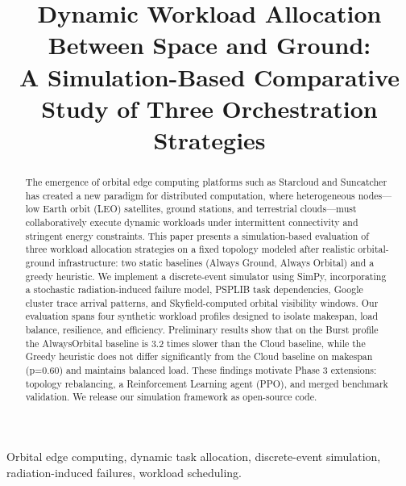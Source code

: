 \documentclass[conference]{IEEEtran}
\begin{document}
\title{Dynamic Workload Allocation Between Space and Ground:\\ A Simulation-Based Comparative Study of Three Orchestration Strategies}

\author{
}

\maketitle

\begin{abstract}
The emergence of orbital edge computing platforms such as Starcloud and Suncatcher has created a new paradigm for distributed computation, where heterogeneous nodes---low Earth orbit (LEO) satellites, ground stations, and terrestrial clouds---must collaboratively execute dynamic workloads under intermittent connectivity and stringent energy constraints. This paper presents a simulation-based evaluation of three workload allocation strategies on a fixed topology modeled after realistic orbital-ground infrastructure: two static baselines (Always Ground, Always Orbital) and a greedy heuristic. We implement a discrete-event simulator using SimPy, incorporating a stochastic radiation-induced failure model, PSPLIB task dependencies, Google cluster trace arrival patterns, and Skyfield-computed orbital visibility windows. Our evaluation spans four synthetic workload profiles designed to isolate makespan, load balance, resilience, and efficiency. Preliminary results show that on the Burst profile the AlwaysOrbital baseline is 3.2 times slower than the Cloud baseline, while the Greedy heuristic does not differ significantly from the Cloud baseline on makespan (p=0.60) and maintains balanced load. These findings motivate Phase 3 extensions: topology rebalancing, a Reinforcement Learning agent (PPO), and merged benchmark validation. We release our simulation framework as open-source code.
\end{abstract}

\begin{IEEEkeywords}
Orbital edge computing, dynamic task allocation, discrete-event simulation, radiation-induced failures, workload scheduling.
\end{IEEEkeywords}
\end{document}
